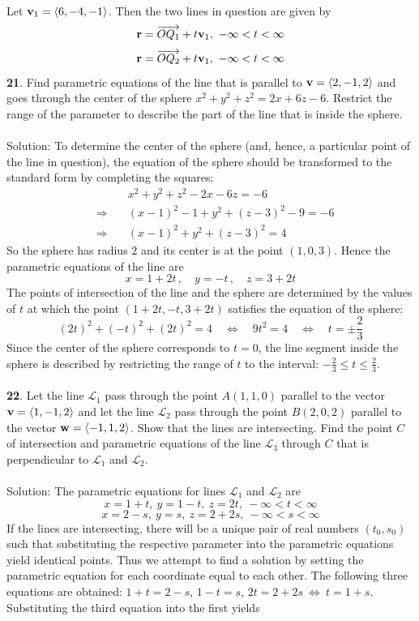 \documentclass[12pt]{amsbook}
\let\cal\mathcal
\newcommand{\la}{\langle}
\newcommand{\ra}{\rangle}
\begin{document}
Let ${\bf v}_1=\la 6,-4,-1\ra$. Then the two lines in question are given by
$${\bf r}=\overrightarrow{OQ_1}+t{\bf v}_1, \ -\infty<t<\infty$$
$${\bf r}=\overrightarrow{OQ_2}+t{\bf v}_1, \ -\infty<t<\infty$$
{\small\bf 21}. Find parametric equations of the line that is parallel
to ${\bf v} = \la 2, -1, 2\ra$ and goes through the center of the
sphere $x^2 + y^2 + z^2 = 2x + 6z - 6$. Restrict the range of the
parameter to describe the part of the line that is inside the
sphere.\\
\\
{\sc Solution}: To determine the center 
of the sphere (and, hence, a particular point of the line
in question), the equation of the sphere should be transformed
to the standard form by completing the squares:
\begin{eqnarray*}
&&\quad x^2 + y^2 + z^2 -
2x - 6z =-6\\
 &\Rightarrow&\quad
(x-1)^2-1 +y^2 +(z-3)^2-9=-6\\
&\Rightarrow&\quad (x-1)^2 +y^2 +(z-3)^2=4
\end{eqnarray*}
So the sphere has radius $2$ and its center is at 
the point $(1,0,3)$. Hence the parametric equations 
of the line are
$$
x=1+2t\,,\quad y=-t\,,\quad z=3+2t
$$
The points of intersection of the line and the sphere
are determined by the values of $t$ at which
the point $(1+2t,-t,3+2t)$ satisfies the equation 
of the sphere:
$$
(2t)^2 +(-t)^2 +(2t)^2 = 4 \quad\Leftrightarrow\quad
9t^2=4\quad\Leftrightarrow\quad t=\pm\frac 23
$$
Since the center of the sphere corresponds to $t=0$,
the line segment inside the sphere is described 
by restricting the range of $t$ to the interval:
$-\frac 23\leq t\leq \frac 23$.
\\
\\
{\small\bf 22}. Let the line ${\cal L}_1$ pass through the point
$A(1,1,0)$ parallel to the vector ${\bf v}=\langle 1,-1,2\rangle$
and let the line ${\cal L}_2$ pass through the point $B(2,0,2)$
parallel to the vector ${\bf w}=\langle -1,1,2\rangle$. Show that
the lines are intersecting. Find the point $C$ of intersection and
parametric equations of the line ${\cal L}_3$ through $C$ that is
perpendicular to ${\cal L}_1$ and ${\cal L}_2$.\\
\\
{\sc Solution}: The parametric equations for lines $\mathcal{L}_1$ and $\mathcal{L}_2$ are
 $$x=1+t, \ y=1-t, \ z=2t, \ -\infty<t<\infty$$ 
  $$x=2-s, \ y=s, \ z=2+2s, \ -\infty<s<\infty$$ 
 If the lines are intersecting, there will be a unique pair of real numbers $(t_0,s_0)$ such that substituting the respective parameter into the parametric equations yield identical points. Thus we attempt to find a solution by setting the parametric equation for each coordinate equal to each other. The following three equations are obtained: $1+t=2-s$, $1-t=s$, $2t=2+2s \ \Leftrightarrow \ t=1+s$. Substituting the third equation into the first yields 
\end{document}
